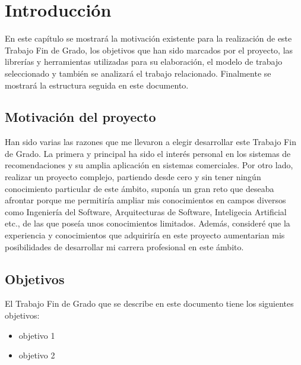 \chapter{Introducción}
\thispagestyle{empty}

En este capítulo se mostrará la motivación existente para la realización de este Trabajo Fin de Grado, los objetivos que han sido marcados por el proyecto, las librerías y herramientas utilizadas para su elaboración, el modelo de trabajo seleccionado y también se analizará el trabajo relacionado. Finalmente se mostrará la estructura seguida en este documento.

\section{Motivación del proyecto}
\thispagestyle{empty}

       \vspace{1cm}

Han sido varias las razones que me llevaron a elegir desarrollar este Trabajo Fin de Grado. La primera y principal ha sido el interés personal en los sistemas de recomendaciones y su amplia aplicación en sistemas comerciales. Por otro lado, realizar un proyecto complejo, partiendo desde cero y sin tener ningún conocimiento particular de este ámbito, suponía un gran reto que deseaba afrontar porque me permitiría ampliar mis conocimientos en campos diversos como Ingeniería del Software, Arquitecturas de Software, Inteligecia Artificial etc., de las que poseía unos conocimientos limitados. Además, consideré que la experiencia y conocimientos que adquiriría en este proyecto aumentarian mis posibilidades de desarrollar mi carrera profesional en este ámbito.

\section{Objetivos}
\thispagestyle{empty}

       \vspace{1cm}

El Trabajo Fin de Grado que se describe en este documento tiene los siguientes objetivos:

\begin{itemize}
	\item objetivo 1
	\item objetivo 2
\end{itemize}



